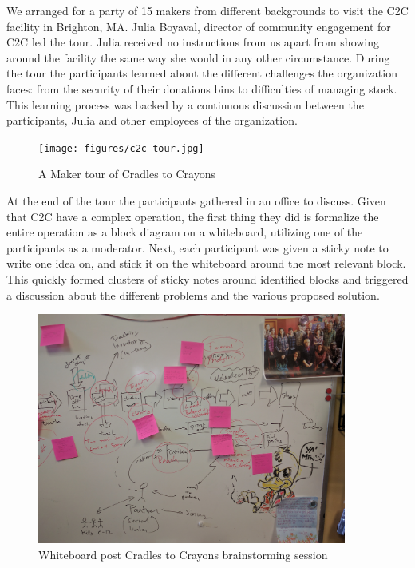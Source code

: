 We arranged for a party of 15 makers from different backgrounds to visit the C2C facility in Brighton, MA. Julia Boyaval, director of community engagement for C2C led the tour. Julia received no instructions from us apart from showing around the facility the same way she would in any other circumstance. During the tour the participants learned about the different challenges the organization faces: from the security of their donations bins to difficulties of managing stock. This learning process was backed by a continuous discussion between the participants, Julia and other employees of the organization. 

   \begin{figure}[thpb]
      \centering
      \texttt{[image: figures/c2c-tour.jpg]}
      \caption{A Maker tour of Cradles to Crayons}
      \label{fig_setc_class}
   \end{figure}

At the end of the tour the participants gathered in an office to discuss. Given that C2C have a complex operation, the first thing they did is formalize the entire operation as a block diagram on a whiteboard, utilizing one of the participants as a moderator. Next, each participant was given a sticky note to write one idea on, and stick it on the whiteboard around the most relevant block. This quickly formed clusters of sticky notes around identified blocks and triggered a discussion about the different problems and the various proposed solution. 

   \begin{figure}[thpb]
      \centering
      \includegraphics[width=4in]{figures/c2c-brainstorming.jpg}
      \caption{Whiteboard post Cradles to Crayons brainstorming session}
      \label{fig_setc_class}
   \end{figure}


